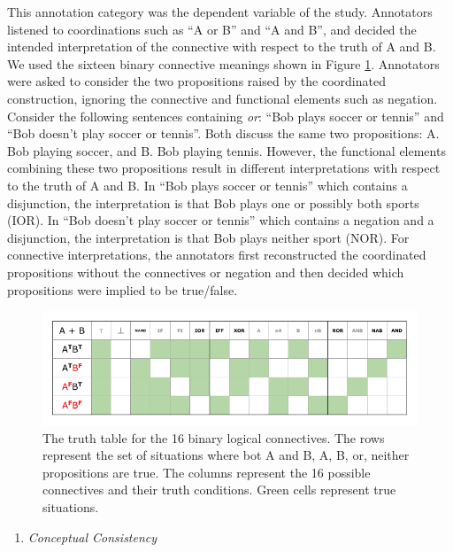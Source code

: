 \documentclass[,man,floatsintext]{apa6}
\providecommand{\tightlist}{%
  \setlength{\itemsep}{0pt}\setlength{\parskip}{0pt}}
\begin{document}
This annotation category was the dependent variable of the study. Annotators listened to coordinations such as \enquote{A or B} and \enquote{A and B}, and decided the intended interpretation of the connective with respect to the truth of A and B. We used the sixteen binary connective meanings shown in Figure \ref{fig:logicalConnectives}. Annotators were asked to consider the two propositions raised by the coordinated construction, ignoring the connective and functional elements such as negation. Consider the following sentences containing \emph{or}: \enquote{Bob plays soccer or tennis} and \enquote{Bob doesn't play soccer or tennis}. Both discuss the same two propositions: A. Bob playing soccer, and B. Bob playing tennis. However, the functional elements combining these two propositions result in different interpretations with respect to the truth of A and B. In \enquote{Bob plays soccer or tennis} which contains a disjunction, the interpretation is that Bob plays one or possibly both sports (IOR). In \enquote{Bob doesn't play soccer or tennis} which contains a negation and a disjunction, the interpretation is that Bob plays neither sport (NOR). For connective interpretations, the annotators first reconstructed the coordinated propositions without the connectives or negation and then decided which propositions were implied to be true/false.

\begin{figure}[tb]

{\centering \includegraphics{figs/logicalConnectives-1} 

}

\caption{The truth table for the 16 binary  logical connectives. The rows represent the set of situations where bot A and B, A, B, or, neither propositions are true. The columns represent the 16 possible connectives and their truth conditions. Green cells represent true situations.}\label{fig:logicalConnectives}
\end{figure}

\begin{enumerate}
\def\labelenumi{\arabic{enumi}.}
\setcounter{enumi}{1}
\tightlist
\item
  \emph{Conceptual Consistency}
\end{enumerate}
\end{document}
